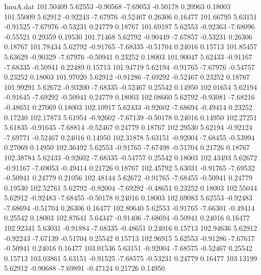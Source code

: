 \begin{filecontents}{ImuA.dat}
 101.50409    5.62553   -0.90568   -7.69053   -0.50178    0.20963    0.18003
 101.55009    5.62912   -0.92243   -7.67976   -0.52467    0.26306    0.16477
 101.66795    5.63151   -0.91525   -7.67976   -0.53231    0.24779    0.18767
 101.69187    5.62553   -0.92363   -7.68096   -0.55521    0.29359    0.19530
 101.71468    5.62792   -0.90449   -7.67857   -0.53231    0.26306    0.18767
 101.78434    5.62792   -0.91765   -7.68335   -0.51704    0.24016    0.15713
 101.85457    5.63629   -0.90329   -7.67976   -0.50941    0.23252    0.18003
 101.90047    5.62433   -0.91167   -7.68335   -0.50941    0.22489    0.15713
 101.94719    5.62194   -0.91765   -7.67976   -0.54757    0.23252    0.18003
 101.97020    5.62912   -0.91286   -7.69292   -0.52467    0.23252    0.18767
 101.99291    5.62672   -0.93200   -7.68335   -0.52467    0.25542    0.14950
 102.01654    5.62194   -0.91645   -7.69292   -0.50941    0.24779    0.18003
 102.08660    5.62792   -0.93081   -7.68216   -0.48651    0.27069    0.18003
 102.10917    5.62433   -0.92602   -7.68694   -0.49414    0.23252    0.17240
 102.17873    5.61954   -0.92602   -7.67139   -0.50178    0.24016    0.14950
 102.27251    5.61835   -0.91645   -7.68814   -0.52467    0.24779    0.18767
 102.29530    5.62194   -0.92124   -7.69771   -0.52467    0.24016    0.14950
 102.31878    5.63151   -0.92004   -7.68455   -0.53994    0.27069    0.14950
 102.36492    5.62553   -0.91765   -7.67498   -0.51704    0.21726    0.18767
 102.38784    5.62433   -0.92602   -7.68335   -0.54757    0.25542    0.18003
 102.43493    5.62672   -0.91167   -7.69053   -0.49414    0.21726    0.18767
 102.45792    5.63031   -0.91765   -7.69532   -0.50941    0.24779    0.21056
 102.48144    5.62672   -0.91765   -7.68455   -0.50941    0.24779    0.19530
 102.52761    5.62792   -0.92004   -7.69292   -0.48651    0.23252    0.18003
 102.55044    5.62912   -0.92483   -7.68455   -0.50178    0.24016    0.18003
 102.69083    5.62553   -0.92483   -7.68694   -0.51704    0.26306    0.16477
 102.80640    5.62553   -0.91765   -7.66301   -0.49414    0.25542    0.18003
 102.87641    5.64347   -0.91406   -7.68694   -0.50941    0.24016    0.16477
 102.92341    5.63031   -0.91884   -7.68335   -0.48651    0.24016    0.15713
 102.94636    5.62912   -0.92243   -7.67139   -0.51704    0.25542    0.15713
 102.96915    5.62553   -0.91286   -7.67617   -0.50941    0.24016    0.16477
 103.01536    5.63151   -0.92004   -7.68575   -0.52467    0.25542    0.15713
 103.03861    5.63151   -0.91525   -7.68575   -0.53231    0.24779    0.16477
 103.13199    5.62912   -0.90688   -7.69891   -0.47124    0.21726    0.14950

\end{filecontents}
